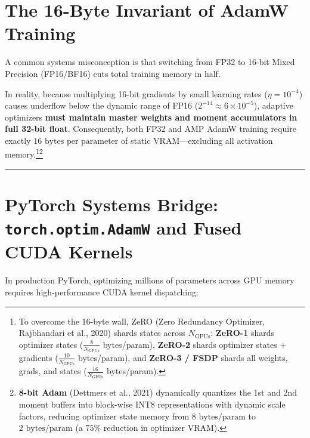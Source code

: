 \documentclass[
  letterpaper,
]{scrbook}
\begin{document}
\section{The 16-Byte Invariant of AdamW
Training}\label{the-16-byte-invariant-of-adamw-training}

A common systems misconception is that switching from FP32 to 16-bit
Mixed Precision (FP16/BF16) cuts total training memory in half.

In reality, because multiplying 16-bit gradients by small learning rates
(\(\eta = 10^{-4}\)) causes underflow below the dynamic range of FP16
(\(2^{-14} \approx 6 \times 10^{-5}\)), adaptive optimizers \textbf{must
maintain master weights and moment accumulators in full 32-bit float}.
Consequently, both FP32 and AMP AdamW training require exactly
\textbf{\(16\text{ bytes per parameter}\)} of static VRAM---excluding
all activation memory.\footnote{To overcome the 16-byte wall, ZeRO (Zero
  Redundancy Optimizer, Rajbhandari et al., 2020) shards states across
  \(N_{\text{GPUs}}\): \textbf{ZeRO-1} shards optimizer states
  (\(\frac{8}{N_{\text{GPUs}}}\) bytes/param), \textbf{ZeRO-2} shards
  optimizer states + gradients (\(\frac{10}{N_{\text{GPUs}}}\)
  bytes/param), and \textbf{ZeRO-3 / FSDP} shards all weights, grads,
  and states (\(\frac{16}{N_{\text{GPUs}}}\) bytes/param).}\footnote{\textbf{8-bit
  Adam} (Dettmers et al., 2021) dynamically quantizes the 1st and 2nd
  moment buffers into block-wise INT8 representations with dynamic scale
  factors, reducing optimizer state memory from \(8\text{ bytes/param}\)
  to \(2\text{ bytes/param}\) (a \(75\%\) reduction in optimizer VRAM).}

\begin{center}\rule{0.5\linewidth}{0.5pt}\end{center}

\section{\texorpdfstring{PyTorch Systems Bridge:
\texttt{torch.optim.AdamW} and Fused CUDA
Kernels}{PyTorch Systems Bridge: torch.optim.AdamW and Fused CUDA Kernels}}\label{pytorch-systems-bridge-torch.optim.adamw-and-fused-cuda-kernels}

In production PyTorch, optimizing millions of parameters across GPU
memory requires high-performance CUDA kernel dispatching:
\end{document}
